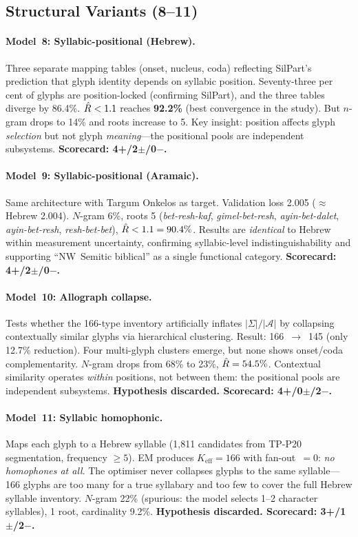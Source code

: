 \subsection{Structural Variants (8--11)}

\paragraph{Model~8: Syllabic-positional (Hebrew).}
Three separate mapping tables (onset, nucleus, coda) reflecting SilPart's prediction that glyph identity depends on syllabic position.  Seventy-three per cent of glyphs are position-locked (confirming SilPart), and the three tables diverge by 86.4\%.  $\hat{R} < 1.1$ reaches \textbf{92.2\%} (best convergence in the study).  But $n$-gram drops to 14\% and roots increase to 5.  Key insight: position affects glyph \emph{selection} but not glyph \emph{meaning}---the positional pools are independent subsystems.  \textbf{Scorecard: 4+/2$\pm$/0$-$.}

\paragraph{Model~9: Syllabic-positional (Aramaic).}
Same architecture with Targum Onkelos as target.  Validation loss 2.005 ($\approx$ Hebrew 2.004).  $N$-gram 6\%, roots 5 (\textit{bet-resh-kaf}, \textit{gimel-bet-resh}, \textit{ayin-bet-dalet}, \textit{ayin-bet-resh}, \textit{resh-bet-bet}), $\hat{R} < 1.1 = 90.4\%$.  Results are \emph{identical} to Hebrew within measurement uncertainty, confirming syllabic-level indistinguishability and supporting ``NW~Semitic biblical'' as a single functional category.  \textbf{Scorecard: 4+/2$\pm$/0$-$.}

\paragraph{Model~10: Allograph collapse.}
Tests whether the 166-type inventory artificially inflates $|\Sigma|/|\mathcal{A}|$ by collapsing contextually similar glyphs via hierarchical clustering.  Result: 166~$\to$~145 (only 12.7\% reduction).  Four multi-glyph clusters emerge, but none shows onset/coda complementarity.  $N$-gram drops from 68\% to 23\%, $\hat{R} = 54.5\%$.  Contextual similarity operates \emph{within} positions, not between them: the positional pools are independent subsystems.  \textbf{Hypothesis discarded.  Scorecard: 4+/0$\pm$/2$-$.}

\paragraph{Model~11: Syllabic homophonic.}
Maps each glyph to a Hebrew syllable (1,811 candidates from TP-P20 segmentation, frequency $\geq 5$).  EM produces $K_{\text{eff}} = 166$ with fan-out~$= 0$: \emph{no homophones at all}.  The optimiser never collapses glyphs to the same syllable---166 glyphs are too many for a true syllabary and too few to cover the full Hebrew syllable inventory.  $N$-gram 22\% (spurious: the model selects 1--2 character syllables), 1 root, cardinality 9.2\%.  \textbf{Hypothesis discarded.  Scorecard: 3+/1$\pm$/2$-$.}

